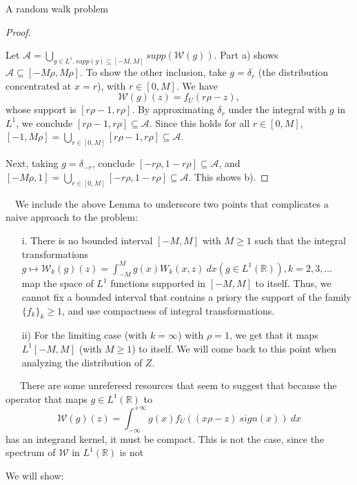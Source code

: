 \documentclass[12pt]{article}
\begin{document}
\begin{section}{A random walk problem}
\begin{proof}
\  

Let $ \mathcal{A} = \bigcup_{g \in L^1 , supp(g) \subseteq [-M,M]} supp(\mathcal{W}(g)) $. Part a) shows $\mathcal{A}  \subseteq [-M \rho,M \rho] $. To show the other inclusion, take $g = \delta_r$ (the distribution concentrated at $x=r$), with $r \in [0,M]$. We have 
$$
\mathcal{W}(g)(z) = f_U(r \rho -z) ,
$$
whose support is $[r \rho-1,r \rho]$. By approximating $\delta_r$ under the integral with $g$ in $L^1$, we conclude $[r \rho-1,r \rho] \subseteq \mathcal{A}$. Since this holds for all $r \in [0,M]$, $[-1,M \rho] = \bigcup_{r \in [0,M]} [r \rho-1,r \rho] \subseteq \mathcal{A}$.  

 Next, taking $g=\delta_{-r}$, conclude $[- r \rho, 1 - r \rho] \subseteq \mathcal{A}$, and $[-M \rho,1] =  \bigcup_{r \in [0,M]} [-r \rho, 1 -r \rho] \subseteq \mathcal{A}$. This shows b).
\end{proof}

\ 
\ 
We include the above Lemma to underscore two points that complicates a naive approach to the problem:
\begin{itemize}
\item[i.] There is no bounded interval $[-M,M]$ with $M\ge1$ such that the integral transformations $ g \mapsto \mathcal{W}_k(g)(z) = \int_{-M}^{M} g(x) W_k(x,z) \ dx  ( g \in L^1(\mathbb{R})), k = 2, 3, \dots $ map the space of $L^1$ functions supported in $[-M,M]$ to itself. Thus, we cannot fix a bounded interval that contains a priory the support of the family $\{f_k\}_k \ge 1$, and use compactness of integral transformations.  

\item[ii)] For the limiting case (with $k=\infty$) with $\rho = 1$, we get that it maps $L^1[-M,M]$ (with $M \ge 1$) to itself. We will come back to this point when analyzing the distribution of $Z$.
\end{itemize}


\  
\ 
\ 
There are some unrefereed resources that seem to suggest that because the operator that maps $g \in L^1(\mathbb{R})$ to $$\mathcal{W}(g)(z)=\int_{-\infty}^{+\infty} g(x) f_U\!\left(  \left(x \rho - z \right)\ sign(x) \right) \ dx$$
has an integrand kernel, it must be compact. This is not the case, since the spectrum of $\mathcal{W}$ in $L^1(\mathbb{R})$ is not  
\  
\ 
\ 


We will show:


\end{section}
\end{document}
